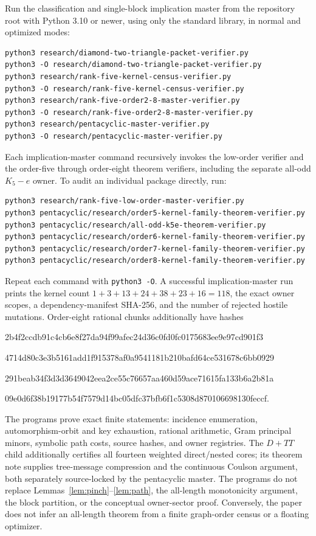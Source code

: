 \documentclass[11pt]{article}
\theoremstyle{remark}
\begin{document}
Run the classification and single-block implication master from the repository
root with Python 3.10 or newer, using only the standard library, in normal and
optimized modes:
\begin{verbatim}
python3 research/diamond-two-triangle-packet-verifier.py
python3 -O research/diamond-two-triangle-packet-verifier.py
python3 research/rank-five-kernel-census-verifier.py
python3 -O research/rank-five-kernel-census-verifier.py
python3 research/rank-five-order2-8-master-verifier.py
python3 -O research/rank-five-order2-8-master-verifier.py
python3 research/pentacyclic-master-verifier.py
python3 -O research/pentacyclic-master-verifier.py
\end{verbatim}
Each implication-master command recursively invokes the low-order verifier and
the order-five through order-eight theorem verifiers, including the separate
all-odd $K_5-e$ owner.  To audit an individual package directly, run:
\begin{verbatim}
python3 research/rank-five-low-order-master-verifier.py
python3 pentacyclic/research/order5-kernel-family-theorem-verifier.py
python3 pentacyclic/research/all-odd-k5e-theorem-verifier.py
python3 pentacyclic/research/order6-kernel-family-theorem-verifier.py
python3 pentacyclic/research/order7-kernel-family-theorem-verifier.py
python3 pentacyclic/research/order8-kernel-family-theorem-verifier.py
\end{verbatim}
Repeat each command with \verb|python3 -O|.  A successful implication-master
run prints the kernel count $1+3+13+24+38+23+16=118$, the exact owner scopes, a
dependency-manifest SHA-256, and the number of rejected hostile mutations.
Order-eight rational chunks additionally have hashes
\begin{center}\ttfamily\scriptsize
2b4f2ccdb91c4cb6e8f27da94f99afec24d36c0fd0fc0175683ee9e97cd901f3\par
4714d80c3e3b5161add1f915378af0a9541181b210bafd64ce531678c6bb0929\par
291beab34f3d3d3649042eea2ce55c76657aa460d59ace71615fa133b6a2b81a\par
09e0d6f38b19177b54f7579d14bc05dfc37bfb6f1c5308d870106698130feccf.
\end{center}

The programs prove exact finite statements: incidence enumeration,
automorphism-orbit and key exhaustion, rational arithmetic, Gram principal
minors, symbolic path costs, source hashes, and owner registries.  The
$D+TT$ child additionally certifies all fourteen weighted direct/nested cores;
its theorem note supplies tree-message compression and the continuous Coulson
argument, both separately source-locked by the pentacyclic master.  The
programs do not replace Lemmas~\ref{lem:pinch}--\ref{lem:path}, the all-length
monotonicity argument, the block partition, or the conceptual owner-sector
proof.  Conversely, the paper does not infer an all-length theorem from a
finite graph-order census or a floating optimizer.
\end{document}
